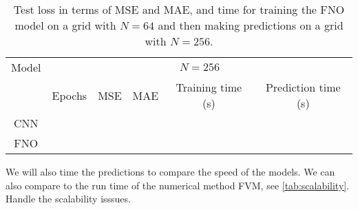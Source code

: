 \begin{table}[H]
    \centering
    \begin{tabular}{c|ccccc}
        Model & \multicolumn{5}{c}{$N = 256$} \\
        \cline{2-6}
        & Epochs & MSE & MAE & Training time (s) & Prediction time (s) \\
        \hline
        CNN &
         &
         &
         &
         &
         \\
        FNO  &
         &
         &
         &
         &
         
    \end{tabular}
    \caption{Test loss in terms of MSE and MAE, and time for training the FNO model on a grid with $N = 64$ and then making predictions on a grid with $N = 256$.}\label{tab:results_2D_FNO_train_64_test_256}
\end{table}



We will also time the predictions to compare the speed of the models.
We can also compare to the run time of the numerical method FVM, see \autoref{tab:scalability}.
Handle the scalability isssues.


